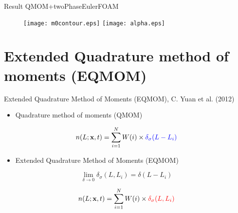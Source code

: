 \documentclass{beamer}
\begin{document}
\begin{frame}{Result QMOM+twoPhaseEulerFOAM}

   \begin{figure}[H]
     \texttt{[image: m0contour.eps]} 
     \texttt{[image: alpha.eps]}

\end{figure} 

\end{frame}

\section{Extended Quadrature method of moments (EQMOM)}

\begin{frame}{Extended Quadrature Method of Moments (EQMOM), C. Yuan et al. (2012) }

\begin{itemize}
\item Quadrature method of moments (QMOM) 
\end{itemize}

\begin{equation*}
n(L;\textbf{x},t)=\sum_{i=1}^{N}W(i)\times \textcolor{blue}{\delta_{\sigma}(L-L_i)}
\end{equation*}


\begin{itemize}
\item Extended Quadrature Method of Moments (EQMOM) 
\end{itemize}

\pause

\begin{equation*}
\lim_{\delta \to 0} \delta_{\sigma}(L,L_i) = \delta(L-L_i)
\end{equation*}

\begin{equation*}
n(L;\textbf{x},t)=\sum_{i=1}^{N}W(i)\times \textcolor{red}{\delta_{\sigma}(L,L_i)}
\end{equation*}

\end{frame}
\end{document}

